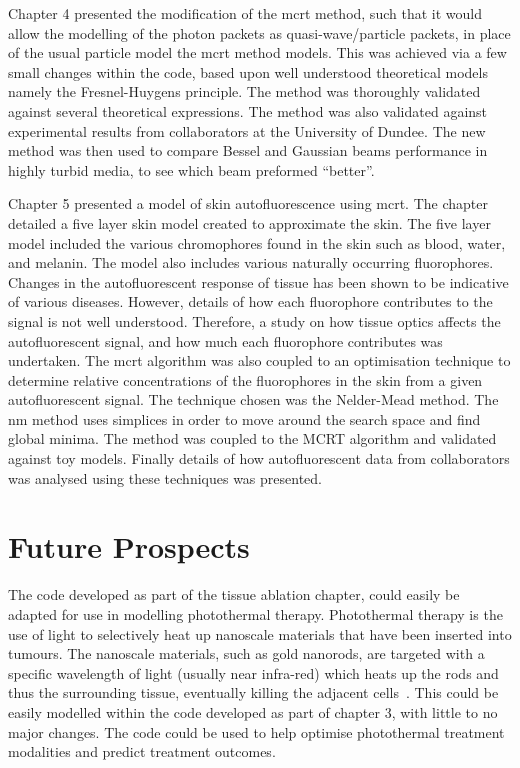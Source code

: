 \medskip

Chapter 4 presented the modification of the \gls*{mcrt} method, such that it would allow the modelling of the photon packets as quasi-wave/particle packets, in place of the usual particle model the \gls*{mcrt} method models.
This was achieved via a few small changes within the code, based upon well understood theoretical models namely the Fresnel-Huygens principle.
The method was thoroughly validated against several theoretical expressions.
The method was also validated against experimental results from collaborators at the University of Dundee.
The new method was then used to compare Bessel and Gaussian beams performance in highly turbid media, to see which beam preformed ``better''.
\medskip

Chapter 5 presented a model of skin autofluorescence using \gls*{mcrt}.
The chapter detailed a five layer skin model created to approximate the skin.
The five layer model included the various chromophores found in the skin such as blood, water, and melanin.
The model also includes various naturally occurring fluorophores.
Changes in the autofluorescent response of tissue has been shown to be indicative of various diseases.
However, details of how each fluorophore contributes to the signal is not well understood.
Therefore, a study on how tissue optics affects the autofluorescent signal, and how much each fluorophore contributes was undertaken.
The \gls*{mcrt} algorithm was also coupled to an optimisation technique to determine relative concentrations of the fluorophores in the skin from a given autofluorescent signal.
The technique chosen was the Nelder-Mead method.
The \gls*{nm} method uses simplices in order to move around the search space and find global minima.
The method was coupled to the MCRT algorithm and validated against toy models.
Finally details of how autofluorescent data from collaborators was analysed using these techniques was presented.

\section{Future Prospects}

The code developed as part of the tissue ablation chapter, could easily be adapted for use in modelling photothermal therapy.
Photothermal therapy is the use of light to selectively heat up nanoscale materials that have been inserted into tumours.
The nanoscale materials, such as gold nanorods, are targeted with a specific wavelength of light (usually near infra-red) which heats up the rods and thus the surrounding tissue, eventually killing the adjacent cells~\cite{singh2016application,gallina2016aptamer}.
This could be easily modelled within the code developed as part of chapter 3, with little to no major changes.
The code could be used to help optimise photothermal treatment modalities and predict treatment outcomes.

